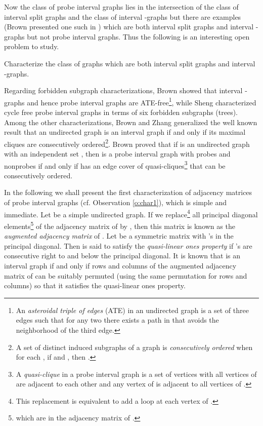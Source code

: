 \documentclass[secthm]{elsart}
\begin{document}
Now the class of probe interval graphs lies in the intersection of the class of interval split graphs and the class of interval -graphs but there are examples (Brown presented one such in \cite{Br}) which are both interval split graphs and interval -graphs but not probe interval graphs. Thus the following is an interesting open problem to study.

\begin{prob}
Characterize the class of graphs which are both interval split graphs and interval -graphs.
\end{prob}

Regarding forbidden subgraph characterizations, Brown \cite{Br} showed that interval -graphs and hence probe interval graphs are ATE-free\footnote{An {\em asteroidal triple of edges} (ATE) in an undirected graph  is a set of three edges such that for any two there exists a path in  that avoids the neighborhood of the third edge.}, while Sheng \cite{LS} characterized cycle free probe interval graphs in terms of six forbidden subgraphs (trees). Among the other characterizations, Brown \cite{Br} and Zhang \cite{Z} generalized the well known \cite{GH,G} result that an undirected graph is an interval graph if and only if its maximal cliques are consecutively ordered\footnote{A set of distinct induced subgraphs  of a graph  is {\em consecutively ordered} when for each , if  and , then .}. Brown \cite{Br} proved that if  is an undirected graph with an independent set , then  is a probe interval graph with probes  and nonprobes  if and only if  has an edge cover of quasi-cliques\footnote{A {\em quasi-clique}  in a probe interval graph  is a set of vertices with all vertices of  are adjacent to each other and any vertex of  is adjacent to all vertices of .} that can be consecutively ordered. 

In the following we shall present the first characterization of adjacency matrices of probe interval graphs (cf. Observation \ref{o:char1}), which is simple and immediate. Let  be a simple undirected graph. If we replace\footnote{This replacement is equivalent to add a loop at each vertex of .} all principal diagonal elements\footnote{which are  in the adjacency matrix of .} of the adjacency matrix of  by , then this matrix is known as the {\em \label{'augmented'} augmented adjacency matrix} of . Let  be a symmetric  matrix with 's in the principal diagonal. Then  is said to satisfy the {\em quasi-linear ones property} if 's are consecutive right to and below the principal diagonal. It is known \cite{MR} that  is an interval graph if and only if rows and columns of the augmented adjacency matrix of  can be suitably permuted (using the same permutation for rows and columns) so that it satisfies the quasi-linear ones property.
\end{document}
